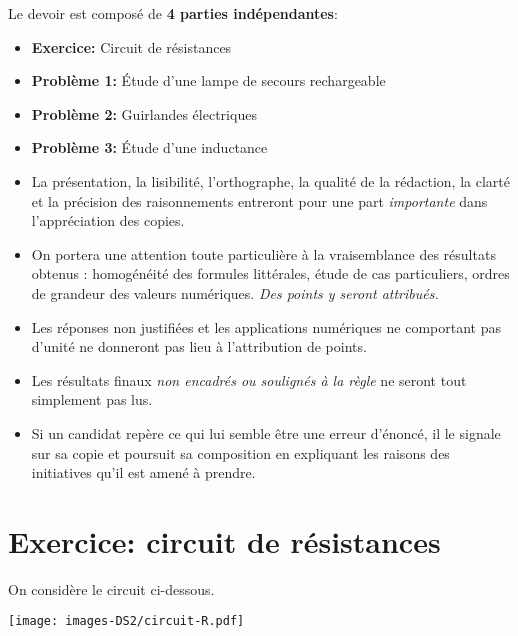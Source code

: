 Le devoir est composé de \textbf{4 parties indépendantes}:

\begin{itemize}
\item
  \textbf{Exercice:} Circuit de résistances
\item
  \textbf{Problème 1:} Étude d'une lampe de secours rechargeable
\item
  \textbf{Problème 2:} Guirlandes électriques
\item
  \textbf{Problème 3:} Étude d'une inductance
\end{itemize}

\begin{itemize}
\item
  La présentation, la lisibilité, l'orthographe, la qualité de la
  rédaction, la clarté et la précision des raisonnements entreront pour
  une part \emph{importante} dans l'appréciation des copies.
\item
  On portera une attention toute particulière à la vraisemblance des
  résultats obtenus : homogénéité des formules littérales, étude de cas
  particuliers, ordres de grandeur des valeurs numériques. \emph{Des
  points y seront attribués.}
\item
  Les réponses non justifiées et les applications numériques ne
  comportant pas d'unité ne donneront pas lieu à l'attribution de
  points.
\item
  Les résultats finaux \emph{non encadrés ou soulignés à la règle} ne
  seront tout simplement pas lus.
\item
  Si un candidat repère ce qui lui semble être une erreur d'énoncé, il
  le signale sur sa copie et poursuit sa composition en expliquant les
  raisons des initiatives qu'il est amené à prendre.
\end{itemize}

\hypertarget{exercice-circuit-de-ruxe9sistances}{%
\section*{Exercice: circuit de
résistances}\label{exercice-circuit-de-ruxe9sistances}}

On considère le circuit ci-dessous.

\texttt{[image: images-DS2/circuit-R.pdf]}

